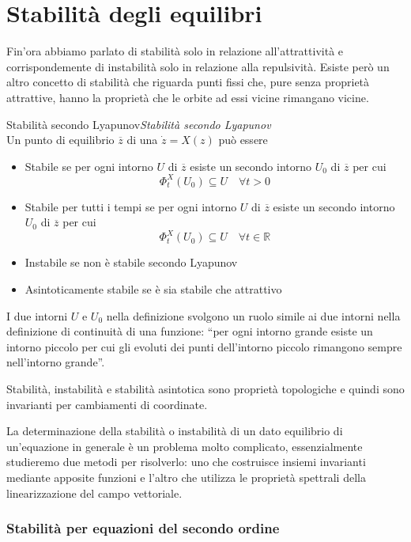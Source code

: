 \documentclass[11pt,a4paper,twoside]{book}
\newenvironment{definizione}[1][\empty]{\begin{Definizione}{
\ifx\empty#1\relax\else\mdseries\itshape#1\\\fi
}{}}{\end{Definizione}}
\theoremstyle{esss}
\theoremstyle{dotless}
\numberwithin{equation}{section} %
\begin{document}
\section{Stabilità degli equilibri}

Fin'ora abbiamo parlato di stabilità solo in relazione all'attrattività e corrispondemente di instabilità solo in relazione alla repulsività. Esiste però un altro concetto di stabilità che riguarda punti fissi che, pure senza proprietà attrattive, hanno la proprietà che le orbite ad essi vicine rimangano vicine.

\begin{definizione}[Stabilità secondo Lyapunov]
Un punto di equilibrio $\overline{z}$ di una $\dot{z}=X(z)$ può essere
\begin{itemize}
\item Stabile se per ogni intorno $U$ di $\overline{z}$ esiste un secondo intorno $U_0$ di $\overline{z}$ per cui
\[
\Phi_t^X(U_0)\subseteq U \quad \forall t>0
\]
\item Stabile per tutti i tempi se per ogni intorno $U$ di $\overline{z}$ esiste un secondo intorno $U_0$ di $\overline{z}$ per cui
\[
\Phi_t^X(U_0)\subseteq U \quad \forall t\in\mathbb{R}
\]
\item Instabile se non è stabile secondo Lyapunov
\item Asintoticamente stabile se è sia stabile che attrattivo
\end{itemize}
\end{definizione}

I due intorni $U$ e $U_0$ nella definizione svolgono un ruolo simile ai due intorni nella definizione di continuità di una funzione: ``per ogni intorno grande esiste un intorno piccolo per cui gli evoluti dei punti dell'intorno piccolo rimangono sempre nell'intorno grande''.

Stabilità, instabilità e stabilità asintotica sono proprietà topologiche e quindi sono invarianti per cambiamenti di coordinate.


La determinazione della stabilità o instabilità di un dato equilibrio di un'equazione in generale è un problema molto complicato, essenzialmente studieremo due metodi per risolverlo: uno che costruisce insiemi invarianti mediante apposite funzioni e l'altro che utilizza le proprietà spettrali della linearizzazione del campo vettoriale.

\subsubsection{Stabilità per equazioni del secondo ordine}
\end{document}
